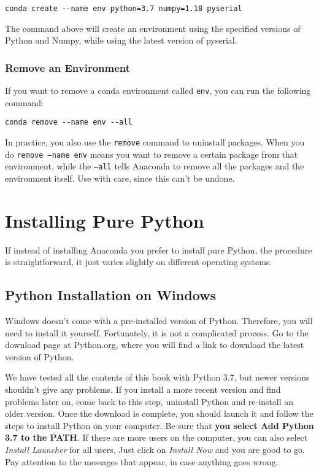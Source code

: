 \begin{verbatim}
conda create --name env python=3.7 numpy=1.18 pyserial
\end{verbatim}

The command above will create an environment using the specified versions of Python and Numpy, while using the latest version of pyserial. 

\subsubsection{Remove an Environment}
If you want to remove a conda environment called \texttt{env}, you can run the following command:

\begin{verbatim}
conda remove --name env --all
\end{verbatim}

In practice, you also use the \texttt{remove} command to uninstall packages. When you do \texttt{remove --name env} means you want to remove a certain package from that environment, while the \texttt{--all} tells Anaconda to remove all the packages and the environment itself. Use with care, since this can't be undone. 

\section{Installing Pure Python}
If instead of installing Anaconda you prefer to install pure Python, the procedure is straightforward, it just varies slightly on different operating systems. 

\subsection{Python Installation on Windows}
Windows doesn't come with a pre-installed version of Python. Therefore, you will need to install it yourself. Fortunately, it is not a complicated process. Go to the download page at Python.org, where you will find a link to download the latest version of Python. 

We have tested all the contents of this book with Python 3.7, but newer versions shouldn't give any problems. If you install a more recent version and find problems later on, come back to this step, uninstall Python and re-install an older version. Once the download is complete, you should launch it and follow the steps to install Python on your computer. Be sure that \textbf{you select Add Python 3.7 to the PATH}. If there are more users on the computer, you can also select \emph{Install Launcher} for all users. Just click on \textit{Install Now} and you are good to go. Pay attention to the messages that appear, in case anything goes wrong.

